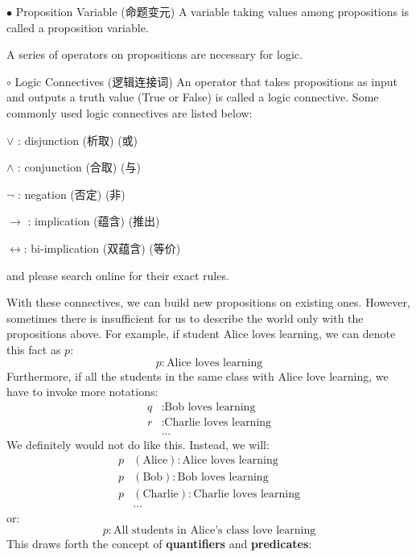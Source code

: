 \documentclass{article}
\begin{document}
\begin{Df}{$\bullet$ Proposition Variable (命题变元)}
    A variable taking values among propositions is called a proposition variable.
\end{Df}

A series of operators on propositions are necessary for logic.

\begin{Df}{$\circ $ Logic Connectives (逻辑连接词)}
    An operator that takes propositions as input and outputs a truth value (True or False) is called a logic connective. Some commonly used logic connectives are listed below:
    \begin{compactitem}
        \item $\lor $ : disjunction (析取) (或)
        \item $\land $ : conjunction (合取) (与)
        \item $\lnot $ : negation (否定) (非)
        \item $\rightarrow $ : implication (蕴含) (推出)
        \item $\leftrightarrow $: bi-implication (双蕴含) (等价)
    \end{compactitem}
    and please search online for their exact rules. 
\end{Df}

With these connectives, we can build new propositions on existing ones. However, sometimes there is insufficient for us to describe the world only with the propositions above. For example, if student Alice loves learning, we can denote this fact as $p$:
$$p: \text{Alice loves learning}$$
Furthermore, if all the students in the same class with Alice love learning, we have to invoke more notations:
\begin{align*}
    q&: \text{Bob loves learning}\\
    r&: \text{Charlie loves learning}\\
     & \dots
\end{align*}
We definitely would not do like this. Instead, we will:
\begin{align*}
    p&(\text{Alice}): \text{Alice loves learning}\\
    p&(\text{Bob}): \text{Bob loves learning}\\
    p&(\text{Charlie}): \text{Charlie loves learning}\\
     & \dots
\end{align*}
or:
$$p: \text{All students in Alice's class love learning}$$
This draws forth the concept of \textbf{quantifiers} and \textbf{predicates}:
\end{document}
